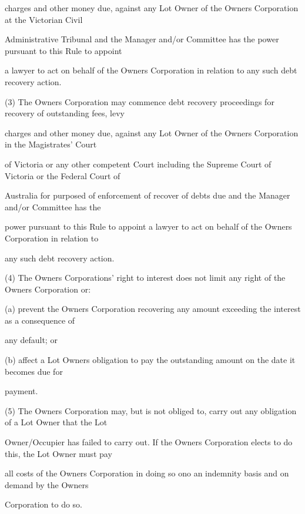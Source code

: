 \documentclass{article}
\begin{document}
{\fontsize{10.02}{1}charges and other money due, against any Lot Owner of the Owners Corporation at the Victorian Civil }

{\fontsize{10.02}{1}Administrative Tribunal and the Manager and/or Committee has the power pursuant to this Rule to appoint }

{\fontsize{10.02}{1}a lawyer to act on behalf of the Owners Corporation in relation to any such debt recovery action. }

{\fontsize{9.962}{1}(3) The Owners Corporation may commence debt recovery proceedings for recovery of outstanding fees, levy }

{\fontsize{10.02}{1}charges and other money due, against any Lot Owner of the Owners Corporation in the Magistrates’ Court }

{\fontsize{10.02}{1}of Victoria or any other competent Court including the Supreme Court of Victoria or the Federal Court of }

{\fontsize{10.02}{1}Australia for purposed of enforcement of recover of debts due and the Manager and/or Committee has the }

{\fontsize{10.02}{1}power pursuant to this Rule to appoint a lawyer to act on behalf of the Owners Corporation in relation to }

{\fontsize{10.02}{1}any such debt recovery action. }

{\fontsize{9.962}{1}(4) The Owners Corporations’ right to interest does not limit any right of the Owners Corporation or: }

{\fontsize{9.962}{1}(a) prevent the Owners Corporation recovering any amount exceeding the interest as a consequence of }

{\fontsize{10.02}{1}any default; or }

{\fontsize{9.962}{1}(b) affect a Lot Owners obligation to pay the outstanding amount on the date it becomes due for }

{\fontsize{10.02}{1}payment. }

{\fontsize{9.962}{1}(5) The Owners Corporation may, but is not obliged to, carry out any obligation of a Lot Owner that the Lot }

{\fontsize{10.02}{1}Owner/Occupier has failed to carry out. If the Owners Corporation elects to do this, the Lot Owner must pay }

{\fontsize{10.02}{1}all costs of the Owners Corporation in doing so ono an indemnity basis and on demand by the Owners }

{\fontsize{10.02}{1}Corporation to do so. }
\end{document}

